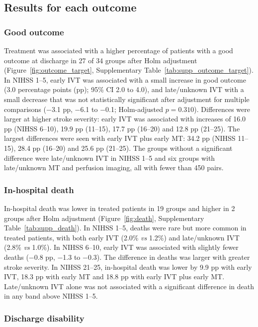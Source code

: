 \clearpage

\subsection*{Results for each outcome}

\subsubsection*{Good outcome}

Treatment was associated with a higher percentage of patients with a good outcome at discharge in 27 of 34 groups after Holm adjustment (Figure~\ref{fig:outcome_target}, Supplementary Table~\ref{tab:supp_outcome_target}). In NIHSS 1--5, early IVT was associated with a small increase in good outcome (3.0 percentage points (pp); 95\% CI 2.0 to 4.0), and late/unknown IVT with a small decrease that was not statistically significant after adjustment for multiple comparisons ($-$3.1 pp, $-$6.1 to $-$0.1; Holm-adjusted $p = 0.310$). Differences were larger at higher stroke severity: early IVT was associated with increases of 16.0 pp (NIHSS 6--10), 19.9 pp (11--15), 17.7 pp (16--20) and 12.8 pp (21--25). The largest differences were seen with early IVT plus early MT: 34.2 pp (NIHSS 11--15), 28.4 pp (16--20) and 25.6 pp (21--25). The groups without a significant difference were late/unknown IVT in NIHSS 1--5 and six groups with late/unknown MT and perfusion imaging, all with fewer than 450 pairs.

\subsubsection*{In-hospital death}

In-hospital death was lower in treated patients in 19 groups and higher in 2 groups after Holm adjustment (Figure~\ref{fig:death}, Supplementary Table~\ref{tab:supp_death}). In NIHSS 1--5, deaths were rare but more common in treated patients, with both early IVT (2.0\% \textit{vs} 1.2\%) and late/unknown IVT (2.8\% \textit{vs} 1.0\%). In NIHSS 6--10, early IVT was associated with slightly fewer deaths ($-$0.8 pp, $-$1.3 to $-$0.3). The difference in deaths was larger with greater stroke severity. In NIHSS 21--25, in-hospital death was lower by 9.9 pp with early IVT, 18.3 pp with early MT and 18.8 pp with early IVT plus early MT. Late/unknown IVT alone was not associated with a significant difference in death in any band above NIHSS 1--5.

\subsubsection*{Discharge disability}

